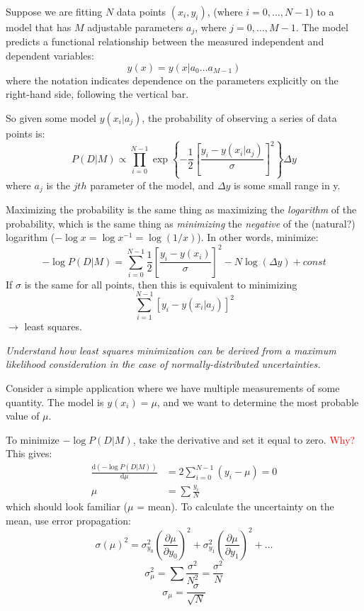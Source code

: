 \documentclass{article}
\newcommand{\test}[1]{%
    \begin{center}
        \colorbox{hl}{\parbox{0.9\textwidth}{\emph{\centering #1}}}
    \end{center}}
\newcommand{\mynotes}[1]{%
    \textcolor{myGreen}{#1}
    }
\begin{document}
\mynotes{
    Suppose we are fitting $N$ data points $(x_{i},y_{i})$,
    (where $i=0,\ldots,N-1$) to a model
    that has $M$ adjustable parameters $a_{j}$, where $j=0,\ldots,M-1$.
    The model predicts a functional relationship between the measured
    independent and dependent variables:
    \[
        y(x) = y(x|a_{0} \ldots a_{M-1})
        \]
    where the notation indicates dependence on the parameters explicitly on the
    right-hand side, following the vertical bar.
}

So given some model $y(x_{i}|a_{j})$, the probability of observing a
series of data points is:
\[
    P(D|M) \propto \prod_{i=0}^{N-1}{
        \exp  \left\{ -\frac{1}{2} \left[ \frac{y_{i} - y(x_{i}|a_{j})}{\sigma}
        \right] ^{2} \right\}}
    \Delta{y}
    \]
where $a_{j}$ is the $jth$ parameter of the model, and $\Delta y$ is some small
range in y.

Maximizing the probability is the same thing as
maximizing the \emph{logarithm} of the probability, which is the same thing as
\emph{minimizing} the \emph{negative} of the (natural?) logarithm
($-\log{x} = \log{x^{-1}} = \log(1/x)$).
In other words, minimize:
\[
    -\log P(D|M) = \sum^{N-1}_{i=0}{
        \frac{1}{2} \left[ \frac{y_{i} - y(x_{i})}{\sigma}
        \right]^2
    }
    - N\log \left( \Delta{y} \right) + const
    \]
If $\sigma$ is the same for all points, then this is equivalent to minimizing
\[
    \sum_{i=1}^{N-1}{
        \left[ y_{i} - y \left( x_{i}|a_{j} \right) \right]^{2} }
   \]
$\rightarrow$ least squares.

\test{Understand how least squares minimization can be derived from a maximum
    likelihood consideration in the case of normally-distributed
    uncertainties.}

Consider a simple application where we have multiple measurements of some
quantity. The model is $y(x_{i}) = \mu$, and we want to determine the
most probable value of $\mu$.

To minimize $-\log{P(D|M)}$, take the derivative and set it equal to zero.
\textcolor{red}{Why?}
This gives:
\begin{align*}
    \frac{\mathrm{d}(-\log P(D|M))}{\mathrm{d}\mu}
    &= 2\sum^{N-1}_{i=0}(y_{i}-\mu) = 0 \\[1ex]
    \mu &= \sum \frac{y_{i}}{N}
\end{align*}
which should look familiar ($\mu$ = mean).
To calculate the uncertainty on the mean, use error propagation:
\[
    \sigma(\mu)^2 = \sigma_{y_{0}}^2
    \left( \frac{\partial{\mu}}{\partial{y}_{0}}\right)^2
    + \sigma_{y_{1}}^2
    \left( \frac{\partial{\mu}}{\partial{y}_{1}}\right)^2
    + \ldots
    \]
\[
    \sigma_{\mu}^{2}
    = \sum{ \frac{\sigma^{2}}{N^{2}}
    = \frac{\sigma^{2}}{N}}
    \]
\[
    \sigma_{\mu} = \frac{\sigma}{\sqrt{N}}
    \]
\end{document}
